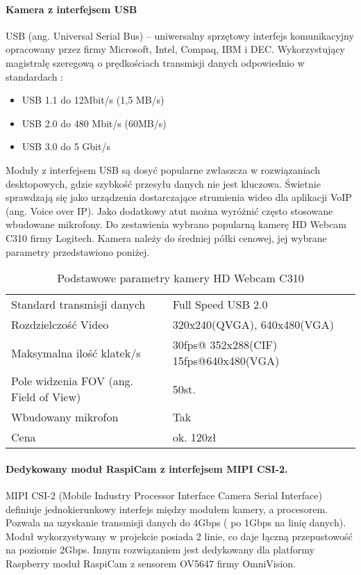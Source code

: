 \paragraph{Kamera  z interfejsem USB}

USB (ang. Universal Serial Bus) – uniwersalny sprzętowy interfejs komunikacyjny opracowany przez firmy Microsoft, Intel, Compaq, IBM i DEC. Wykorzystujący magistralę szeregową o prędkościach transmisji danych odpowiednio w standardach :

\begin{itemize}[noitemsep]
\item USB 1.1 do 12Mbit/s (1,5 MB/s)
\item USB 2.0 do 480 Mbit/s (60MB/s)
\item USB 3.0 do 5 Gbit/s 
\end{itemize}

Moduły z interfejsem USB są dosyć popularne zwłaszcza w rozwiązaniach desktopowych, gdzie szybkość przesyłu danych nie jest kluczowa. Świetnie sprawdzają się jako urządzenia dostarczające strumienia wideo dla aplikacji VoIP (ang. Voice over IP). Jako dodatkowy atut można wyróżnić często stosowane wbudowane mikrofony.
Do zestawienia wybrano popularną kamerę  HD Webcam C310 firmy Logitech. Kamera należy do średniej półki cenowej, jej wybrane parametry przedstawiono poniżej.


\begin{table}[hbt!]
\caption[Podstawowe parametry kamery HD Webcam C310]{Podstawowe parametry kamery HD Webcam C310}
\begin{tabularx}{\textwidth}{|l|X|} 
 \hline
Standard transmisji danych &	Full Speed USB 2.0 \\
Rozdzielczość Video &	320x240(QVGA), 640x480(VGA) \\
Maksymalna ilość klatek/s &	30fps@ 352x288(CIF) 15fps@640x480(VGA) \\
Pole widzenia FOV (ang. Field of View) &	50st. \\
Wbudowany mikrofon &	Tak\\
Cena &	ok. 120zł\\
\hline
\end{tabularx}  
\label{tab:compareAnalysers}
\end{table}


\paragraph{ Dedykowany moduł RaspiCam z interfejsem MIPI CSI-2. } MIPI CSI-2 (Mobile Industry Processor Interface Camera Serial Interface) definiuje jednokierunkowy interfejs między modułem kamery, a procesorem. Pozwala na uzyskanie transmisji danych do 4Gbps ( po 1Gbps na linię danych). Moduł wykorzystywany w projekcie posiada 2 linie, co daje łączną przepustowość na poziomie 2Gbps.
Innym rozwiązaniem jest dedykowany dla platformy Raspberry moduł RaspiCam z  sensorem  OV5647 firmy OmniVision. 

